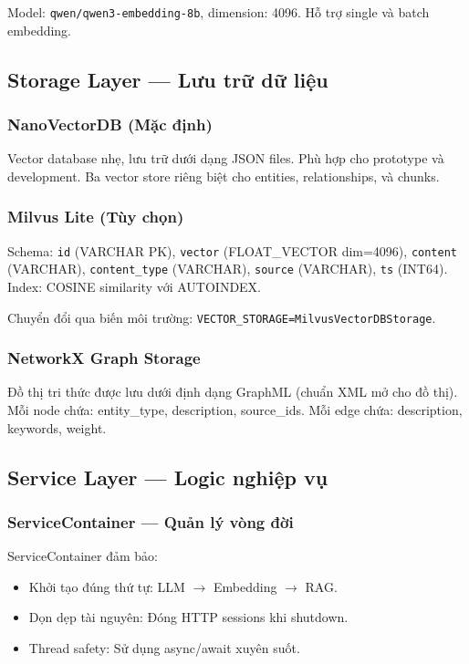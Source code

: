 \documentclass[12pt,a4paper]{article}
\begin{document}
Model: \texttt{qwen/qwen3-embedding-8b}, dimension: 4096. Hỗ trợ single và batch embedding.

\subsection{Storage Layer --- Lưu trữ dữ liệu}

\subsubsection{NanoVectorDB (Mặc định)}

Vector database nhẹ, lưu trữ dưới dạng JSON files. Phù hợp cho prototype và development. Ba vector store riêng biệt cho entities, relationships, và chunks.

\subsubsection{Milvus Lite (Tùy chọn)}

Schema: \texttt{id} (VARCHAR PK), \texttt{vector} (FLOAT\_VECTOR dim=4096), \texttt{content} (VARCHAR), \texttt{content\_type} (VARCHAR), \texttt{source} (VARCHAR), \texttt{ts} (INT64). Index: COSINE similarity với AUTOINDEX.

Chuyển đổi qua biến môi trường: \texttt{VECTOR\_STORAGE=MilvusVectorDBStorage}.

\subsubsection{NetworkX Graph Storage}

Đồ thị tri thức được lưu dưới định dạng GraphML (chuẩn XML mở cho đồ thị). Mỗi node chứa: entity\_type, description, source\_ids. Mỗi edge chứa: description, keywords, weight.

\subsection{Service Layer --- Logic nghiệp vụ}

\subsubsection{ServiceContainer --- Quản lý vòng đời}

ServiceContainer đảm bảo:
\begin{itemize}
  \item Khởi tạo đúng thứ tự: LLM $\to$ Embedding $\to$ RAG.
  \item Dọn dẹp tài nguyên: Đóng HTTP sessions khi shutdown.
  \item Thread safety: Sử dụng async/await xuyên suốt.
\end{itemize}
\end{document}
